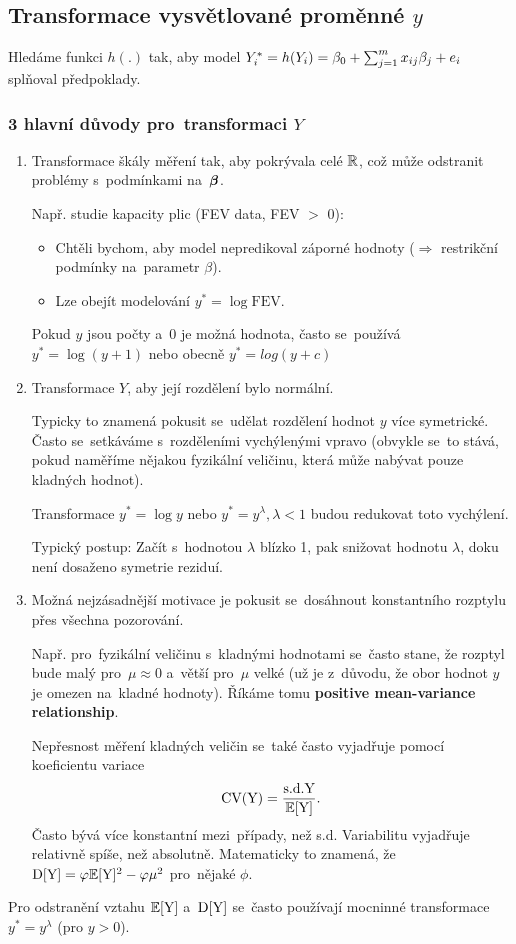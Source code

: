 \subsection{Transformace vysvětlované proměnné $y$ }

Hledáme funkci $h(.)$ tak, aby model $Y_i^* = h(Y_i) = \beta_0 + \sum_{j=1}^{m} x_{ij} \beta_j + e_i$ splňoval předpoklady.

\subsubsection*{3 hlavní důvody pro~transformaci $Y$ }
\begin{enumerate}
	\item Transformace škály měření tak, aby pokrývala celé $\mathbb{R}$, což může odstranit problémy s~podmínkami na~$\boldsymbol{\beta}$.
	
	Např. studie kapacity plic (FEV data, FEV $>$ 0):
	\begin{itemize}
		\item Chtěli bychom, aby model nepredikoval záporné hodnoty ($\Rightarrow$ restrikční podmínky na~parametr $\beta$).
		\item Lze obejít modelování $y^* = \log \mathrm{FEV}$.
	\end{itemize}

	Pokud $y$ jsou počty a~0 je možná hodnota, často se~používá $y^* = \log (y+1)$ nebo obecně $y^* = log(y + c)$
	
	\item Transformace $Y$, aby její rozdělení bylo  normální.
	
	Typicky to znamená pokusit se~udělat rozdělení hodnot $y$ více symetrické. Často se~setkáváme s~rozděleními vychýlenými vpravo (obvykle se~to stává, pokud naměříme nějakou fyzikální veličinu, která může nabývat pouze kladných hodnot).
	
	Transformace $y^* = \log y$ nebo $y^* = y^{\lambda}, \lambda < 1$ budou redukovat toto vychýlení.
	
	Typický postup: Začít s~hodnotou $\lambda$ blízko 1, pak snižovat hodnotu $\lambda$, doku není dosaženo  symetrie reziduí.
	
	\item Možná nejzásadnější motivace je pokusit se~dosáhnout konstantního rozptylu přes všechna pozorování.
	
	Např. pro~fyzikální veličinu s~kladnými hodnotami se~často stane, že rozptyl bude malý pro~$\mu \approx 0$ a~větší pro~$\mu$ velké (už je z~důvodu, že obor hodnot $y$ je omezen na~kladné hodnoty). Říkáme tomu \textbf{positive mean-variance relationship}.
	
  Nepřesnost měření kladných veličin se~také často vyjadřuje pomocí koeficientu variace
 $$
 \text{CV}(\text{Y}) = \frac{\text{s.d.} \text{Y}}{\mathbb{E}[\text{Y}]}.
 $$
Často bývá více konstantní mezi~případy, než s.d. Variabilitu vyjadřuje relativně spíše, než absolutně. Matematicky to znamená, že $\mathrm{D}[\text{Y}] = \varphi \mathbb{E}[\text{Y}]^2 - \varphi \mu^2$ pro~nějaké $\phi$.

\end{enumerate}Pro odstranění vztahu $\mathbb{E} [\text{Y}]$ a~$\mathrm{D}[\text{Y}]$ se~často používají mocninné transformace $y^* = y^{\lambda}$ (pro $y > 0$).

